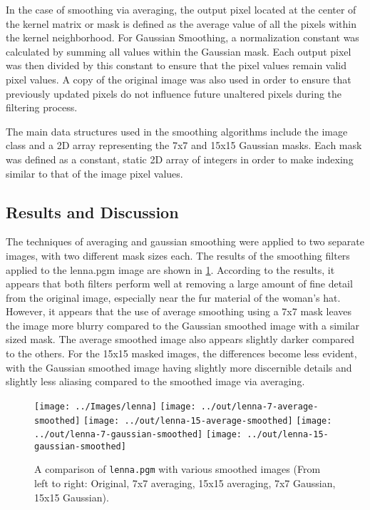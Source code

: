 \documentclass[headings=optiontoheadandtoc,listof=totoc,parskip=full]{scrartcl}
\begin{document}
In the case of smoothing via averaging, the output pixel located at the center of the kernel matrix or mask is defined as the average value of all the pixels within the kernel neighborhood. For Gaussian Smoothing, a normalization constant was calculated by summing all values within the Gaussian mask. Each output pixel was then divided by this constant to ensure that the pixel values remain valid pixel values. A copy of the original image was also used in order to ensure that previously updated pixels do not influence future unaltered pixels during the filtering process.

The main data structures used in the smoothing algorithms include the image class and a 2D array representing the 7x7 and 15x15 Gaussian masks. Each mask was defined as a constant, static 2D array of integers in order to make indexing similar to that of the image pixel values.


\subsection{Results and Discussion}

The techniques of averaging and gaussian smoothing were applied to two separate images, with two different mask sizes each. The results of the smoothing filters applied to the lenna.pgm image are shown in \cref{fig:smoothing-result-1}. According to the results, it appears that both filters perform well at removing a large amount of fine detail from the original image, especially near the fur material of the woman’s hat. However, it appears that the use of average smoothing using a 7x7 mask leaves the image more blurry compared to the Gaussian smoothed image with a similar sized mask. The average smoothed image also appears slightly darker compared to the others. For the 15x15 masked images, the differences become less evident, with the Gaussian smoothed image having slightly more discernible details and slightly less aliasing compared to the smoothed image via averaging. 


\begin{figure}[H]
	\centering
	\texttt{[image: ../Images/lenna]}
	\texttt{[image: ../out/lenna-7-average-smoothed]}
	\texttt{[image: ../out/lenna-15-average-smoothed]}
	\texttt{[image: ../out/lenna-7-gaussian-smoothed]}
	\texttt{[image: ../out/lenna-15-gaussian-smoothed]}
	\caption{A comparison of \texttt{lenna.pgm} with various smoothed images (From left to right: Original, 7x7 averaging, 15x15 averaging, 7x7 Gaussian, 15x15 Gaussian).}
	\label{fig:smoothing-result-1}
\end{figure}
\end{document}
